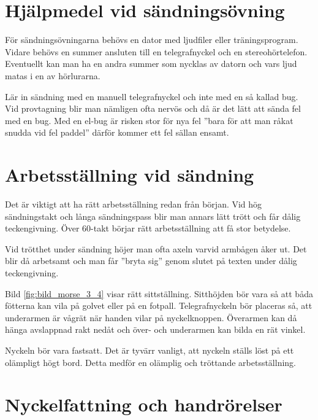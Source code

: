 \section[Övningshjälpmedel]{Hjälpmedel vid sändningsövning}

För sändningsövningarna behövs en dator med ljudfiler eller träningsprogram.
Vidare behövs en summer ansluten till en telegrafnyckel och en stereohörtelefon.
Eventuellt kan man ha en andra summer som nycklas av datorn och vars ljud matas
i en av hörlurarna.

Lär in sändning med en manuell telegrafnyckel och inte med en så kallad bug.
Vid provtagning blir man nämligen ofta nervös och då är det lätt att sända fel
med en bug.
Med en el-bug är risken stor för nya fel ''bara för att man råkat snudda vid fel
paddel'' därför kommer ett fel sällan ensamt.

\section[Ställning]{Arbetsställning vid sändning}


Det är viktigt att ha rätt arbetsställning redan från början.
Vid hög sändningstakt och långa sändningspass blir man annars lätt trött och
får dålig teckengivning.
Över 60-takt börjar rätt arbetsställning att få stor betydelse.

Vid trötthet under sändning höjer man ofta axeln varvid armbågen åker ut.
Det blir då arbetsamt och man får ''bryta sig'' genom slutet på texten under
dålig teckengivning.

Bild \ref{fig:bild_morse_3_4} visar rätt sittställning.
Sitthöjden bör vara så att båda fötterna kan vila på golvet eller på en fotpall.
Telegrafnyckeln bör placeras så, att underarmen är vågrät när handen vilar på
nyckelknoppen.
Överarmen kan då hänga avslappnad rakt nedåt och över- och underarmen kan bilda
en rät vinkel.

Nyckeln bör vara fastsatt. Det är tyvärr vanligt, att nyckeln ställs löst på ett
olämpligt högt bord. Detta medför en olämplig och tröttande arbetsställning.

\section[Fattning]{Nyckelfattning och handrörelser}

